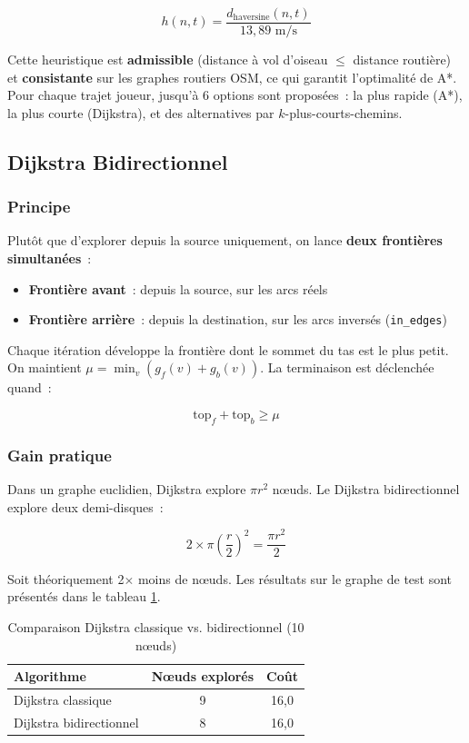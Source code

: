\documentclass[a4paper, 12pt, twoside]{article}
\begin{document}
\[
h(n, t) = \frac{d_{\text{haversine}}(n, t)}{13{,}89 \text{ m/s}}
\]

Cette heuristique est \textbf{admissible} (distance \`{a} vol d'oiseau $\leq$ distance routière) et \textbf{consistante} sur les graphes routiers OSM, ce qui garantit l'optimalit\'{e} de A*. Pour chaque trajet joueur, jusqu'\`{a} 6 options sont propos\'{e}es~: la plus rapide (A*), la plus courte (Dijkstra), et des alternatives par $k$-plus-courts-chemins.

\subsection{Dijkstra Bidirectionnel}

\subsubsection{Principe}

Plut\^{o}t que d'explorer depuis la source uniquement, on lance \textbf{deux fronti\`{e}res simultan\'{e}es}~:
\begin{itemize}
  \item \textbf{Fronti\`{e}re avant}~: depuis la source, sur les arcs r\'{e}els
  \item \textbf{Fronti\`{e}re arri\`{e}re}~: depuis la destination, sur les arcs invers\'{e}s (\texttt{in\_edges})
\end{itemize}

Chaque it\'{e}ration d\'{e}veloppe la fronti\`{e}re dont le sommet du tas est le plus petit. On maintient $\mu = \min_{v} (g_f(v) + g_b(v))$. La terminaison est d\'{e}clench\'{e}e quand~:

\[
\text{top}_{f} + \text{top}_{b} \geq \mu
\]

\subsubsection{Gain pratique}

Dans un graphe euclidien, Dijkstra explore $\pi r^2$ n\oe uds. Le Dijkstra bidirectionnel explore deux demi-disques~:

\[
2 \times \pi \left(\frac{r}{2}\right)^2 = \frac{\pi r^2}{2}
\]

Soit th\'{e}oriquement 2$\times$ moins de n\oe uds. Les r\'{e}sultats sur le graphe de test sont pr\'{e}sent\'{e}s dans le tableau \ref{tab:dijkstra}.

\begin{table}[h]
\begin{center}
\begin{tabular}{|l|c|c|}
\hline
\textbf{Algorithme} & \textbf{N\oe uds explor\'{e}s} & \textbf{Co\^{u}t} \\
\hline
Dijkstra classique & 9 & 16{,}0 \\
\hline
Dijkstra bidirectionnel & 8 & 16{,}0 \\
\hline
\end{tabular}
\end{center}
\caption{Comparaison Dijkstra classique vs. bidirectionnel (10 n\oe uds)}
\label{tab:dijkstra}
\end{table}
\end{document}
